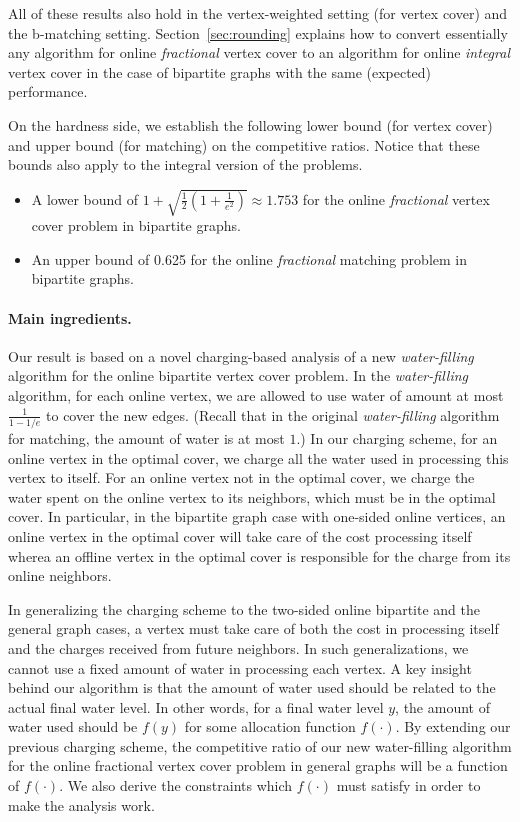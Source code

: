 \documentclass{article}
\begin{document}
All of these results also hold in the vertex-weighted setting (for vertex cover) and the b-matching setting.
Section~\ref{sec:rounding} explains how to convert essentially any algorithm for online {\em fractional} vertex cover to an algorithm for online {\em integral} vertex cover in the case of bipartite graphs with the same (expected) performance. 



On the hardness side, we establish the following lower bound (for vertex cover) and upper bound (for matching) on the competitive ratios. Notice that these bounds also apply to the integral version of the problems.
\begin{itemize}
\item A lower bound of $1+\sqrt{\frac{1}{2}\left(1+\frac{1}{e^2}\right)}\approx 1.753$ for the  online {\em fractional} vertex cover problem in bipartite graphs.
\item An upper bound of 0.625 for the online {\em fractional} matching problem in bipartite graphs. 
\end{itemize}

\paragraph{Main ingredients.}
Our result is based on a novel charging-based analysis of a new {\em water-filling} algorithm for the online bipartite vertex cover problem. In the {\em water-filling} algorithm, for each online vertex, we are allowed to use water of amount at most $\frac{1}{1-1/e}$ to cover the new edges. (Recall that in the original {\em water-filling} algorithm for matching, the amount of water is at most $1$.) In our charging scheme, for an online vertex in the optimal cover, we charge all the water used in processing this vertex to itself. For an online vertex not in the optimal cover, we charge the water spent on the online vertex to its neighbors, which must be in the optimal cover. In particular, in the bipartite graph case with one-sided online vertices, an online vertex in the optimal cover will take care of the cost processing itself wherea an offline vertex in the optimal cover is responsible for the charge from its online neighbors. 

In generalizing the charging scheme to the two-sided online bipartite and the general graph cases, a vertex must take care of both the cost in processing itself and the charges received from future neighbors. In such generalizations, we cannot use a fixed amount of water in processing each vertex. A key insight behind our algorithm is that the amount of water used should be related to the actual final water level. In other words, for a final water level $y$, the amount of water used should be $f(y)$ for some allocation function $f(\cdot)$. By extending our previous charging scheme, the competitive ratio of our new water-filling algorithm for the online fractional vertex cover problem in general graphs will be a function of $f(\cdot)$. We also derive the constraints which $f(\cdot)$ must satisfy in order to make the analysis work.
\end{document}
